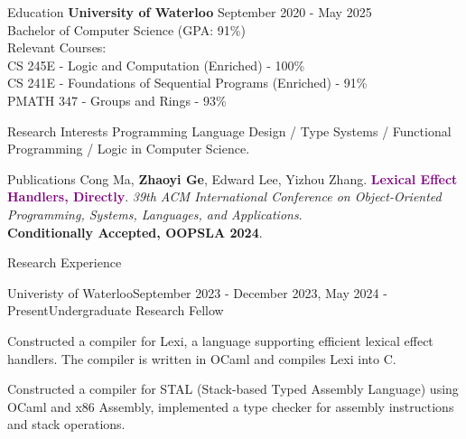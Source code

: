 \documentclass[
	12pt, %
]{resume} %
\begin{document}

\begin{rSection}{Education}
	\textbf{University of Waterloo} \hfill {September 2020 - May 2025} \\ 
	Bachelor of Computer Science (GPA: 91\%) \\
    Relevant Courses: \\
    \hspace*{5mm} CS 245E - Logic and Computation (Enriched) - 100\% \\
    \hspace*{5mm} CS 241E - Foundations of Sequential Programs (Enriched) - 91\% \\
    \hspace*{5mm} PMATH 347 - Groups and Rings - 93\% 
\end{rSection}

\begin{rSection}{Research Interests}
	Programming Language Design / Type Systems / Functional Programming / Logic in Computer Science.
\end{rSection}

\begin{rSection}{Publications}
	{Cong Ma, \textbf{Zhaoyi Ge}, Edward Lee, Yizhou Zhang}. \textcolor{purple}{\textbf{Lexical Effect Handlers, Directly}}.
	\textit{39th ACM International Conference on Object-Oriented Programming, Systems, Languages, and Applications}.
	\\
	\textbf{Conditionally Accepted, OOPSLA 2024}.
\end{rSection}

\begin{rSection}{Research Experience}
	\begin{rSubsection}{Univeristy of Waterloo}{September 2023 - December 2023, May 2024 - Present}{Undergraduate Research Fellow}{}
		\item Constructed a compiler for Lexi, a language supporting efficient lexical effect handlers. The compiler is written in OCaml and compiles Lexi into C.
		\item Constructed a compiler for STAL (Stack-based Typed Assembly Language) using OCaml and x86 Assembly, implemented a type checker for assembly instructions and stack operations. 
	\end{rSubsection}
\end{rSection}
\end{document}
